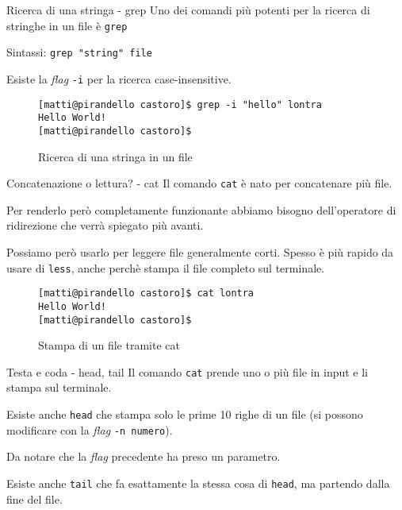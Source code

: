 \begin{frame}[fragile]{Ricerca di una stringa - grep}
  Uno dei comandi più potenti per la ricerca di stringhe in un file è \texttt{grep}\bigskip

  Sintassi: \texttt{grep "string" file}\bigskip

  Esiste la \textit{flag} \texttt{-i} per la ricerca case-insensitive.\bigskip

  \begin{figure}
    \begin{lstlisting}[basicstyle=\footnotesize]
[matti@pirandello castoro]$ grep -i "hello" lontra
Hello World!
[matti@pirandello castoro]$
    \end{lstlisting}
    \caption{Ricerca di una stringa in un file}
  \end{figure}
\end{frame}

\begin{frame}[fragile]{Concatenazione o lettura? - cat}
  Il comando \texttt{cat} è nato per concatenare più file.\bigskip

  Per renderlo però completamente funzionante abbiamo bisogno dell'operatore
  di ridirezione che verrà spiegato più avanti.\bigskip

  Possiamo però usarlo per leggere file generalmente corti. Spesso è più rapido
  da usare di \texttt{less}, anche perchè stampa il file completo sul terminale. \bigskip

  \begin{figure}
    \begin{lstlisting}[basicstyle=\footnotesize]
[matti@pirandello castoro]$ cat lontra
Hello World!
[matti@pirandello castoro]$
    \end{lstlisting}
      \caption{Stampa di un file tramite cat}
  \end{figure}
\end{frame}

\begin{frame}{Testa e coda - head, tail}
  Il comando \texttt{cat} prende uno o più file in input e li stampa sul 
  terminale.\bigskip

  Esiste anche \texttt{head} che stampa solo le prime 10 righe di un file (si
  possono modificare con la \textit{flag} \texttt{-n numero}).\medskip

  Da notare che la \textit{flag} precedente ha preso un parametro.\bigskip

  Esiste anche \texttt{tail} che fa esattamente la stessa cosa di \texttt{head}, 
  ma partendo dalla fine del file.
\end{frame}
